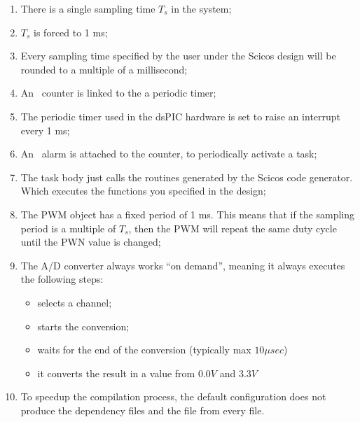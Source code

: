 \begin{enumerate}
\item There is a single sampling time $T_s$ in the system;
\item $T_s$ is forced to 1 ms;
\item Every sampling time specified by the user under the Scicos
  design will be rounded to a multiple of a millisecond;
\item An \ee\ counter is linked to the a periodic timer;
\item The periodic timer used in the dsPIC hardware is set to raise an
  interrupt every 1 ms;
\item An \ee\ alarm is attached to the counter, to periodically
  activate a task;
\item The task body just calls the routines generated by the Scicos
  code generator. Which executes the functions you specified in the
  design;
\item The PWM object has a fixed period of 1 ms. This means that if
  the sampling period is a multiple of $T_s$, then the PWM will repeat
  the same duty cycle until the PWN value is changed;
\item The A/D converter always works ``on demand'', meaning it always
  executes the following steps:
  \begin{itemize}
    \item selects a channel;
    \item starts the conversion;
    \item waits for the end of the conversion (typically max $10 \mu sec$)
    \item it converts the result in a value from $0.0 V$ and $3.3 V$
  \end{itemize}
\item To speedup the compilation process, the default configuration does not produce the dependency files and the  file from every  file.
\end{enumerate}
